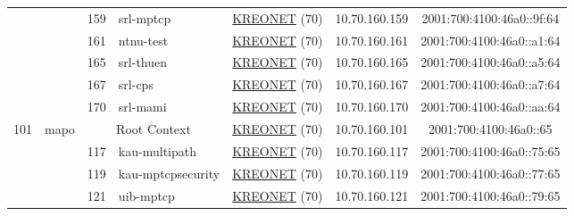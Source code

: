 \begin{small}
\begin{center}
\begin{longtable}{|c|c|c|c|c|c|c|c|}
  &  & \tiny{159} & \multicolumn{1}{|l|}{\tiny{srl-mptcp}} & \multicolumn{2}{|c|}{\tiny{\href{http://www.kreonet.net}{KREONET} (70)}} & \tiny{10.70.160.159} & \tiny{2001:700:4100:46a0::9f:64} \\* \cline{3-3}\cline{4-4}\cline{5-5}\cline{6-6}\cline{7-7}\cline{8-8}
  &  & \tiny{161} & \multicolumn{1}{|l|}{\tiny{ntnu-test}} & \multicolumn{2}{|c|}{\tiny{\href{http://www.kreonet.net}{KREONET} (70)}} & \tiny{10.70.160.161} & \tiny{2001:700:4100:46a0::a1:64} \\* \cline{3-3}\cline{4-4}\cline{5-5}\cline{6-6}\cline{7-7}\cline{8-8}
  &  & \tiny{165} & \multicolumn{1}{|l|}{\tiny{srl-thuen}} & \multicolumn{2}{|c|}{\tiny{\href{http://www.kreonet.net}{KREONET} (70)}} & \tiny{10.70.160.165} & \tiny{2001:700:4100:46a0::a5:64} \\* \cline{3-3}\cline{4-4}\cline{5-5}\cline{6-6}\cline{7-7}\cline{8-8}
  &  & \tiny{167} & \multicolumn{1}{|l|}{\tiny{srl-cps}} & \multicolumn{2}{|c|}{\tiny{\href{http://www.kreonet.net}{KREONET} (70)}} & \tiny{10.70.160.167} & \tiny{2001:700:4100:46a0::a7:64} \\* \cline{3-3}\cline{4-4}\cline{5-5}\cline{6-6}\cline{7-7}\cline{8-8}
  &  & \tiny{170} & \multicolumn{1}{|l|}{\tiny{srl-mami}} & \multicolumn{2}{|c|}{\tiny{\href{http://www.kreonet.net}{KREONET} (70)}} & \tiny{10.70.160.170} & \tiny{2001:700:4100:46a0::aa:64} \\ \hline
 \multirow{30}{*}{\tiny{101}} & \multicolumn{1}{|l|}{\multirow{30}{*}{\tiny{mapo}}} & \multicolumn{2}{|c|}{\tiny{Root Context}} & \multicolumn{2}{|c|}{\tiny{\href{http://www.kreonet.net}{KREONET} (70)}} & \tiny{10.70.160.101} & \tiny{2001:700:4100:46a0::65} \\* \cline{3-3}\cline{4-4}\cline{5-5}\cline{6-6}\cline{7-7}\cline{8-8}
  &  & \tiny{117} & \multicolumn{1}{|l|}{\tiny{kau-multipath}} & \multicolumn{2}{|c|}{\tiny{\href{http://www.kreonet.net}{KREONET} (70)}} & \tiny{10.70.160.117} & \tiny{2001:700:4100:46a0::75:65} \\* \cline{3-3}\cline{4-4}\cline{5-5}\cline{6-6}\cline{7-7}\cline{8-8}
  &  & \tiny{119} & \multicolumn{1}{|l|}{\tiny{kau-mptcpsecurity}} & \multicolumn{2}{|c|}{\tiny{\href{http://www.kreonet.net}{KREONET} (70)}} & \tiny{10.70.160.119} & \tiny{2001:700:4100:46a0::77:65} \\* \cline{3-3}\cline{4-4}\cline{5-5}\cline{6-6}\cline{7-7}\cline{8-8}
  &  & \tiny{121} & \multicolumn{1}{|l|}{\tiny{uib-mptcp}} & \multicolumn{2}{|c|}{\tiny{\href{http://www.kreonet.net}{KREONET} (70)}} & \tiny{10.70.160.121} & \tiny{2001:700:4100:46a0::79:65} \\* \cline{3-3}\cline{4-4}\cline{5-5}\cline{6-6}\cline{7-7}\cline{8-8}

\end{longtable}
\end{center}
\end{small}
